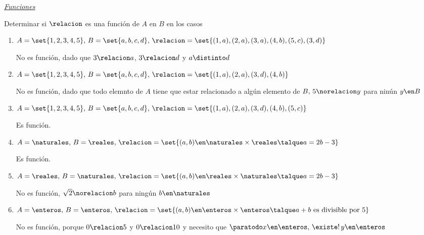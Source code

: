 \separador
\underline{\textit{Funciones}}\par

\begin{enunciado}{\ejercicio}
  Determinar si $\relacion$ es una función de $A$ en $B$ en los casos
\end{enunciado}
  \begin{enumerate}[label=\roman*)]
    \item $A = \set{1,2,3,4,5},\, B = \set{a,b,c,d},\, \relacion = \set{(1,a), (2,a),(3,a),(4,b),(5,c),(3,d)} $\par
          No es función, dado que $3 \relacion a$, $3 \relacion d$ y $a \distinto d$

    \item $A = \set{1,2,3,4,5},\, B = \set{a,b,c,d},\, \relacion = \set{(1,a), (2,a),(3,d),(4,b)}$\par
          No es función, dado que todo elemnto de $A$ tiene que estar relacionado a algún elemento de $B,\, 5 \norelacion y$ para ninún $ y \en B$

    \item $A = \set{1,2,3,4,5},\, B = \set{a,b,c,d},\, \relacion = \set{(1,a), (2,a),(3,d),(4,b),(5,c)} $\par
          Es función.

    \item $A = \naturales,\, B = \reales, \, \relacion = \set{(a,b) \en \naturales \times \reales \talque a = 2b - 3} $\par
          Es función.

    \item $A = \reales,\, B = \naturales, \, \relacion = \set{(a,b) \en \reales \times \naturales \talque a = 2b - 3} $\par
          No es función, $\sqrt{2} \norelacion b$ para ningún $b \en \naturales$
    \item $A = \enteros,\, B = \enteros, \, \relacion = \set{(a,b) \en \enteros \times \enteros \talque a +b \text{ es divisible por }5} $\par
          No es función, porque $0 \relacion 5$ y $0 \relacion 10$ y necesito que $\paratodo x \en \enteros,\, \existe!\, y \en \enteros$
  \end{enumerate}
